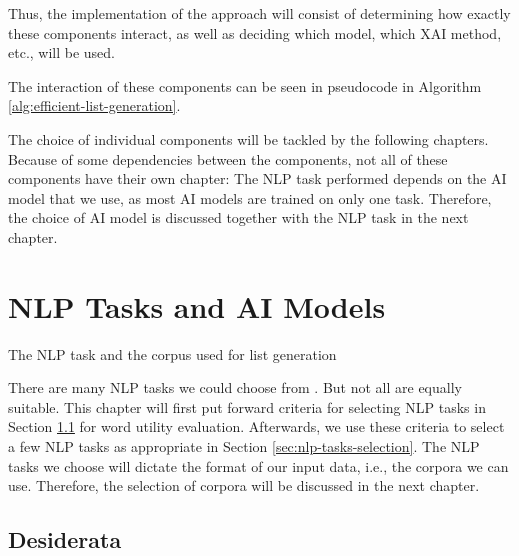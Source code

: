 Thus, the implementation of the approach will consist of determining how exactly these components interact, as well as deciding which model, which XAI method, etc., will be used.

The interaction of these components can be seen in pseudocode in Algorithm \ref{alg:efficient-list-generation}.



The choice of individual components will be tackled by the following chapters.
Because of some dependencies between the components, not all of these components have their own chapter:
The NLP task performed depends on the AI model that we use, as most AI models are trained on only one task.
Therefore, the choice of AI model is discussed together with the NLP task in the next chapter.


\section{NLP Tasks and AI Models}
The NLP task and the corpus used for list generation

There are many NLP tasks we could choose from .
But not all are equally suitable.
This chapter will first put forward criteria for selecting NLP tasks in Section \ref{sec:nlp-tasks-desiderata} for word utility evaluation.
Afterwards, we use these criteria to select a few NLP tasks as appropriate in Section \ref{sec:nlp-tasks-selection}.
The NLP tasks we choose will dictate the format of our input data, i.e., the corpora we can use.
Therefore, the selection of corpora will be discussed in the next chapter.

\subsection{Desiderata} \label{sec:nlp-tasks-desiderata}



